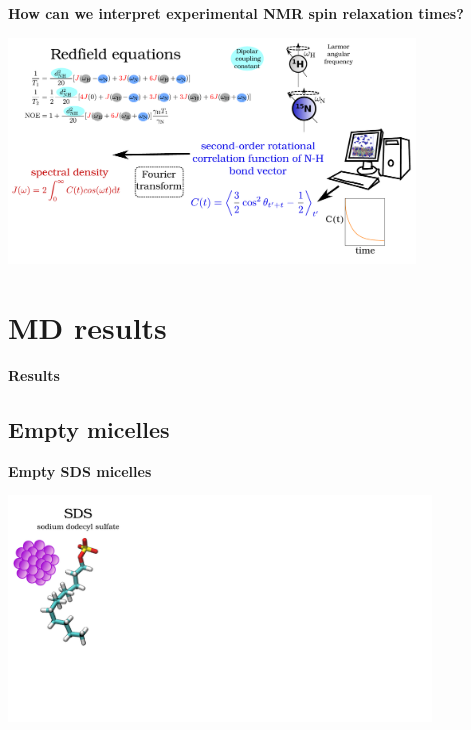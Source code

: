 \documentclass{beamer}
\begin{document}
\addtocounter{framenumber}{-1}
\begin{frame}
\begin{center}
\Large{\centering

\textbf{How can we interpret experimental NMR spin relaxation times?} \\}

\vspace{0.5cm}


\includegraphics[height=6cm]{redfield7.pdf}
\end{center}
\end{frame}

\section{MD results}

\begin{frame}
\LARGE{\centering
\textbf{Results} \\

}


\end{frame}

\subsection{Empty micelles}

\begin{frame}
\begin{center}
\Large{\centering

\textbf{Empty SDS micelles} \\}

\vspace{0.5cm}


\includegraphics[height=6cm]{sds7.pdf}
\end{center}
\end{frame}
\end{document}
